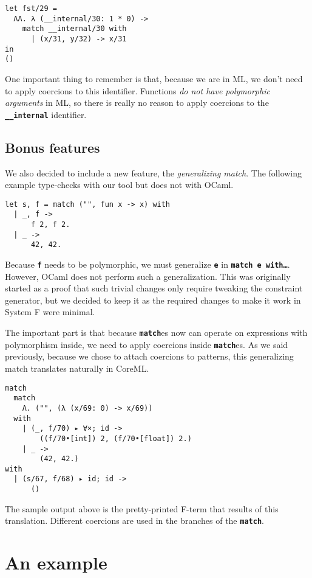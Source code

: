 \documentclass[10pt,a4paper,twoside,titlepage,twocolumn]{article}
\newcommand{\code}[1]{\textbf{\texttt{#1}}}
\begin{document}
\begin{verbatim}
let fst/29 =
  ΛΛ. λ (__internal/30: 1 * 0) -> 
    match __internal/30 with
      | (x/31, y/32) -> x/31
in
()
\end{verbatim}

One important thing to remember is that, because we are in ML, we don't need to
apply coercions to this identifier. Functions \emph{do not have polymorphic
arguments} in ML, so there is really no reason to apply coercions to the
\code{\_\_internal} identifier.

\subsection{Bonus features}

We also decided to include a new feature, the \emph{generalizing match}. The
following example type-checks with our tool but does not with OCaml.

\begin{verbatim}
let s, f = match ("", fun x -> x) with
  | _, f ->
      f 2, f 2.
  | _ ->
      42, 42.
\end{verbatim}

Because \code{f} needs to be polymorphic, we must generalize \code{e} in
\code{match e with\dots}. However, OCaml does not perform such a generalization.
This was originally started as a proof that such trivial changes only require
tweaking the constraint generator, but we decided to keep it as the required
changes to make it work in System F were minimal.

The important part is that because \code{match}es now can operate on
expressions with polymorphism inside, we need to apply coercions inside
\code{match}es. As we said previously, because we chose to attach coercions to
patterns, this generalizing match translates naturally in CoreML.

\begin{verbatim}
match
  match
    Λ. ("", (λ (x/69: 0) -> x/69))
  with
    | (_, f/70) ▸ ∀×; id ->
        ((f/70•[int]) 2, (f/70•[float]) 2.)
    | _ ->
        (42, 42.)
with
  | (s/67, f/68) ▸ id; id ->
      ()
\end{verbatim}

The sample output above is the pretty-printed F-term that results of this
translation. Different coercions are used in the branches of the \code{match}.

\section{An example}
\end{document}
